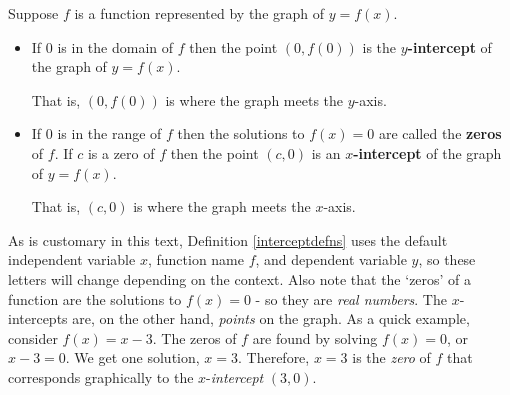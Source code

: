 \medskip

\colorbox{ResultColor}{\bbm

\begin{defn}

\label{interceptdefns}

Suppose $f$ is a function represented by the graph of $y = f(x)$.

\begin{itemize}

\item  If $0$ is in the domain of $f$ then the point $(0, f(0))$ is the   \textbf{$y$-intercept} of the graph of $y = f(x)$.

That is, $(0,f(0))$ is where the graph meets the $y$-axis.

\item  If $0$ is in the range of $f$ then the solutions to $f(x) = 0$ are called the  \textbf{zeros} of $f$.  If $c$ is a zero of $f$ then the point $(c,0)$ is an   \textbf{$x$-intercept} of the graph of $y = f(x)$.

That is, $(c,0)$ is where the graph meets the $x$-axis.

\end{itemize}

\end{defn}

\ebm}

\medskip

As is customary in this text, Definition \ref{interceptdefns} uses the default independent variable $x$, function name $f$, and dependent variable $y$, so these letters will change depending on the context.  Also note that the `zeros' of a function are the solutions to $f(x) = 0$ - so they are \textit{real numbers}.  The $x$-intercepts are, on the other hand, \textit{points} on the graph.  As a quick example, consider $f(x) = x-3$.  The zeros of $f$ are found by solving $f(x) = 0$, or $x-3=0$.  We get one solution, $x = 3$.  Therefore, $x=3$ is the \textit{zero} of $f$ that corresponds graphically to the $x$-\textit{intercept} $(3,0)$.  

\medskip

